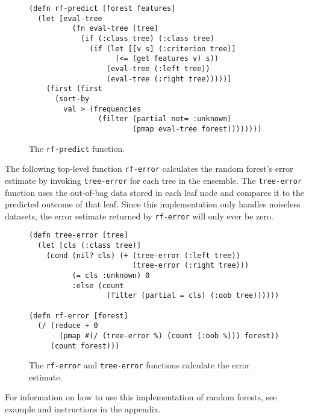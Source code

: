 \documentclass[a4paper,man,12pt,apacite,floatsintext,draftfirst]{apa6} %
\begin{document}
\begin{figure}[H]
\caption{The \texttt{rf-predict} function.}
\begin{verbatim}
(defn rf-predict [forest features]
  (let [eval-tree
          (fn eval-tree [tree]
            (if (:class tree) (:class tree)
              (if (let [[v s] (:criterion tree)]
                    (<= (get features v) s))
                  (eval-tree (:left tree))
                  (eval-tree (:right tree)))))]
    (first (first
      (sort-by
        val > (frequencies
                (filter (partial not= :unknown)
                        (pmap eval-tree forest))))))))
\end{verbatim}
\end{figure}

The following top-level function \texttt{rf-error} calculates the random forest's
error estimate by invoking \texttt{tree-error} for each tree in the ensemble.
The \texttt{tree-error} function uses the out-of-bag data stored in each leaf node
and compares it to the predicted outcome of that leaf.
Since this implementation only handles noiseless datasets, the error estimate
returned by \texttt{rf-error} will only ever be zero.

\begin{figure}[H]
\caption{The \texttt{rf-error} and \texttt{tree-error} functions calculate the error estimate.}
\begin{verbatim}
(defn tree-error [tree]
  (let [cls (:class tree)]
    (cond (nil? cls) (+ (tree-error (:left tree))
                        (tree-error (:right tree)))
          (= cls :unknown) 0
          :else (count
                  (filter (partial = cls) (:oob tree))))))

(defn rf-error [forest]
  (/ (reduce + 0
       (pmap #(/ (tree-error %) (count (:oob %))) forest))
     (count forest)))
\end{verbatim}
\end{figure}

For information on how to use this implementation of random forests,
see example and instructions in the appendix.
\end{document}
